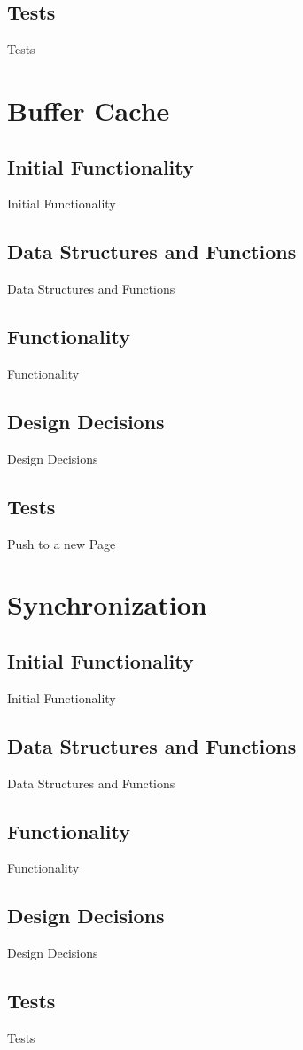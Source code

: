 \subsection{Tests}

Tests

\section{Buffer Cache}
\subsection{Initial Functionality}

Initial Functionality
  

\subsection{Data Structures and Functions}
  
Data Structures and Functions

\subsection{Functionality}
  
Functionality

\subsection{Design Decisions}
  
Design Decisions

\subsection{Tests}

Push to a new Page

\section{Synchronization}
\subsection{Initial Functionality}

Initial Functionality
  

\subsection{Data Structures and Functions}
  
Data Structures and Functions

\subsection{Functionality}
  
Functionality

\subsection{Design Decisions}
  
Design Decisions

\subsection{Tests}

Tests